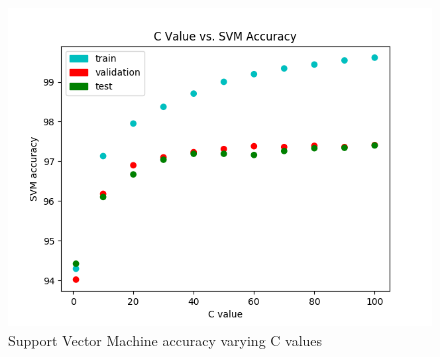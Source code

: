 \documentclass[14pt,A4]{article}
\begin{document}
    \begin{figure}[H]
        \includegraphics[width=\linewidth]{./results/results.png}
        \caption{Support Vector Machine accuracy varying C values}
        \label{fig:plots3}
    \end{figure}

    
\end{document}
